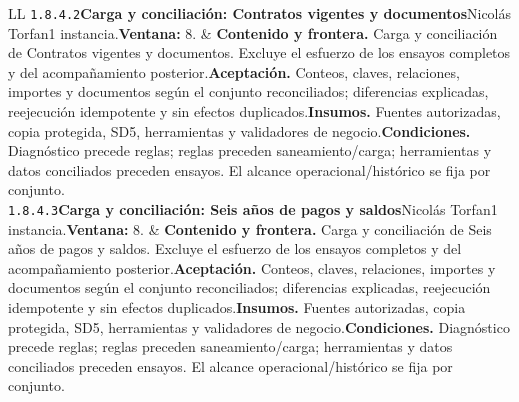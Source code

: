 \begin{longtable}{L{\tabcolsep\relax}L{\tabcolsep\relax}}
\texttt{1.\allowbreak{}8.\allowbreak{}4.\allowbreak{}2}\newline{}\textbf{Carga y conciliación: Contratos vigentes y documentos}\newline{}Nicolás Torfan\newline{}1 instancia.\newline{}\textbf{Ventana:} 8. & \textbf{Contenido y frontera.} Carga y conciliación de Contratos vigentes y documentos. Excluye el esfuerzo de los ensayos completos y del acompañamiento posterior.\newline{}\textbf{Aceptación.} Conteos, claves, relaciones, importes y documentos según el conjunto reconciliados; diferencias explicadas, reejecución idempotente y sin efectos duplicados.\newline{}\textbf{Insumos.} Fuentes autorizadas, copia protegida, SD5, herramientas y validadores de negocio.\newline{}\textbf{Condiciones.} Diagnóstico precede reglas; reglas preceden saneamiento/carga; herramientas y datos conciliados preceden ensayos. El alcance operacional/histórico se fija por conjunto.\\\hline
\texttt{1.\allowbreak{}8.\allowbreak{}4.\allowbreak{}3}\newline{}\textbf{Carga y conciliación: Seis años de pagos y saldos}\newline{}Nicolás Torfan\newline{}1 instancia.\newline{}\textbf{Ventana:} 8. & \textbf{Contenido y frontera.} Carga y conciliación de Seis años de pagos y saldos. Excluye el esfuerzo de los ensayos completos y del acompañamiento posterior.\newline{}\textbf{Aceptación.} Conteos, claves, relaciones, importes y documentos según el conjunto reconciliados; diferencias explicadas, reejecución idempotente y sin efectos duplicados.\newline{}\textbf{Insumos.} Fuentes autorizadas, copia protegida, SD5, herramientas y validadores de negocio.\newline{}\textbf{Condiciones.} Diagnóstico precede reglas; reglas preceden saneamiento/carga; herramientas y datos conciliados preceden ensayos. El alcance operacional/histórico se fija por conjunto.\\\hline

\end{longtable}
